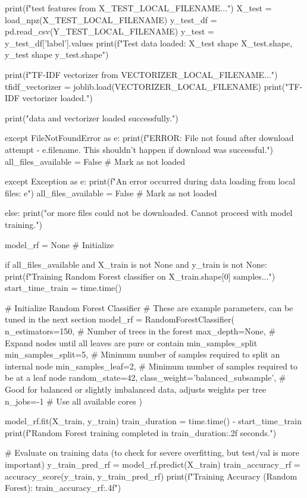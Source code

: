 \begin{ffcode}
        print(f"\nLoading test features from {X_TEST_LOCAL_FILENAME}...")
        X_test = load_npz(X_TEST_LOCAL_FILENAME)
        y_test_df = pd.read_csv(Y_TEST_LOCAL_FILENAME)
        y_test = y_test_df['label'].values
        print(f"Test data loaded: X_test shape {X_test.shape}, y_test shape {y_test.shape}")

        print(f"\nLoading TF-IDF vectorizer from {VECTORIZER_LOCAL_FILENAME}...")
        tfidf_vectorizer = joblib.load(VECTORIZER_LOCAL_FILENAME)
        print("TF-IDF vectorizer loaded.")

        print("\nAll data and vectorizer loaded successfully.")

    except FileNotFoundError as e:
        print(f"ERROR: File not found after download attempt - {e.filename}. This shouldn't happen if download was successful.")
        all_files_available = False # Mark as not loaded

    except Exception as e:
        print(f"An error occurred during data loading from local files: {e}")
        all_files_available = False # Mark as not loaded

else:
    print("\nOne or more files could not be downloaded. Cannot proceed with model training.")

model_rf = None # Initialize

if all_files_available and X_train is not None and y_train is not None:
    print(f"Training Random Forest classifier on {X_train.shape[0]} samples...")
    start_time_train = time.time()

    # Initialize Random Forest Classifier
    # These are example parameters, can be tuned in the next section
    model_rf = RandomForestClassifier(
        n_estimators=150,     # Number of trees in the forest
        max_depth=None,       # Expand nodes until all leaves are pure or contain min_samples_split
        min_samples_split=5,  # Minimum number of samples required to split an internal node
        min_samples_leaf=2,   # Minimum number of samples required to be at a leaf node
        random_state=42,
        class_weight='balanced_subsample', # Good for balanced or slightly imbalanced data, adjusts weights per tree
        n_jobs=-1             # Use all available cores
    )

    model_rf.fit(X_train, y_train)
    train_duration = time.time() - start_time_train
    print(f"Random Forest training completed in {train_duration:.2f} seconds.")

    # Evaluate on training data (to check for severe overfitting, but test/val is more important)
    y_train_pred_rf = model_rf.predict(X_train)
    train_accuracy_rf = accuracy_score(y_train, y_train_pred_rf)
    print(f"Training Accuracy (Random Forest): {train_accuracy_rf:.4f}")


\end{ffcode}
